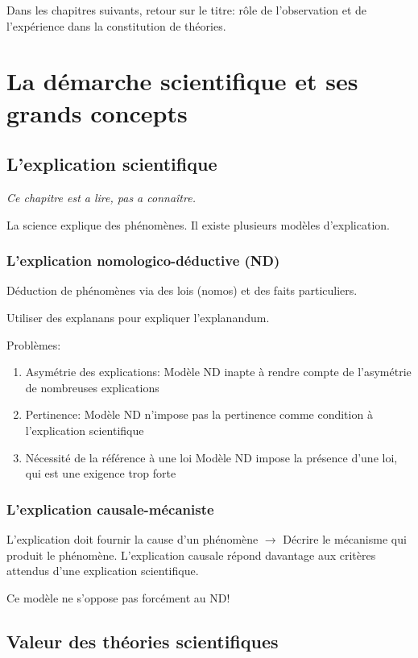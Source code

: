 \documentclass{report}
\begin{document}
	Dans les chapitres suivants, retour sur le titre: rôle de l'observation et de l'expérience dans la constitution de théories.
	
	\chapter{La démarche scientifique et ses grands concepts}
	
	\section{L’explication scientifique}
	
	\emph{Ce chapitre est a lire, pas a connaître.}
	
	La science explique des phénomènes. Il existe plusieurs modèles d'explication.
	
	\subsection{L’explication nomologico-déductive (ND)}
	
	Déduction de phénomènes via des lois (nomos) et des faits particuliers.
	
	Utiliser des explanans pour expliquer l'explanandum.
	
	Problèmes:
	\begin{enumerate}
		\item Asymétrie des explications: Modèle ND inapte à rendre compte de l’asymétrie de nombreuses explications
		\item Pertinence: Modèle ND n’impose pas la pertinence comme condition à l’explication scientifique
		\item Nécessité de la référence à une loi Modèle ND impose la présence d’une loi, qui est une exigence trop forte		
	\end{enumerate}
	
	\subsection{L’explication causale-mécaniste}
	
	L’explication doit fournir la cause d’un phénomène $\rightarrow$ Décrire le mécanisme qui produit le phénomène. L’explication causale répond davantage aux critères attendus d’une explication scientifique.
	
	Ce modèle ne s'oppose pas forcément au ND!
	
	\section{Valeur des théories scientifiques}
\end{document}
